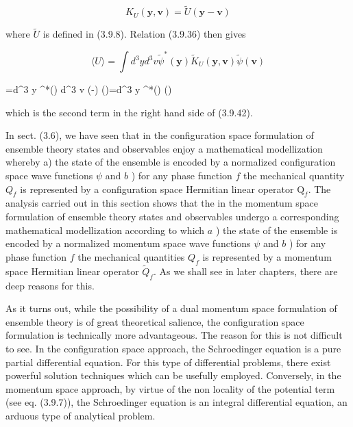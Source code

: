 \documentclass{article}
\begin{document}
\begin{equation*}
K_{U}(\boldsymbol{y}, \boldsymbol{v})=\tilde{U}(\boldsymbol{y}-\boldsymbol{v}) \tag{3.9.47}
\end{equation*}
 
where $\tilde{U}$ is defined in (3.9.8). Relation (3.9.36) then gives
 
\begin{equation*}
\langle U\rangle=\int d^{3} y d^{3} v \tilde{\psi}^{*}(\boldsymbol{y}) \tilde{K}_{U}(\boldsymbol{y}, \boldsymbol{v}) \tilde{\psi}(\boldsymbol{v}) \tag{3.9.48}
\end{equation*}
 
 
=\int d^{3} y \tilde{\psi}^{*}() \int d^{3} v (-) \tilde{\psi}()=\int d^{3} y \tilde{\psi}^{*}()  \tilde{\psi}()
 
which is the second term in the right hand side of (3.9.42).

In sect. (3.6), we have seen that in the configuration space formulation of ensemble theory states and observables enjoy a mathematical modellization whereby a) the state of the ensemble is encoded by a normalized configuration space wave functions $\psi$ and $b$ ) for any phase function $f$ the mechanical quantity $Q_{f}$ is represented by a configuration space Hermitian linear operator $\mathrm{Q}_{f}$. The analysis carried out in this section shows that the in the momentum space formulation of ensemble theory states and observables undergo a corresponding mathematical modellization according to which $a$ ) the state of the ensemble is encoded by a normalized momentum space wave functions $\psi$ and $b$ ) for any phase function $f$ the mechanical quantities $Q_{f}$ is represented by a momentum space Hermitian linear operator $\tilde{Q}_{f}$. As we shall see in later chapters, there are deep reasons for this.

As it turns out, while the possibility of a dual momentum space formulation of ensemble theory is of great theoretical salience, the configuration space formulation is technically more advantageous. The reason for this is not difficult to see. In the configuration space approach, the Schroedinger equation is a pure partial differential equation. For this type of differential problems, there exist powerful solution techniques which can be usefully employed. Conversely, in the momentum space approach, by virtue of the non locality of the potential term (see eq. (3.9.7)), the Schroedinger equation is an integral differential equation, an arduous type of analytical problem.
\end{document}
